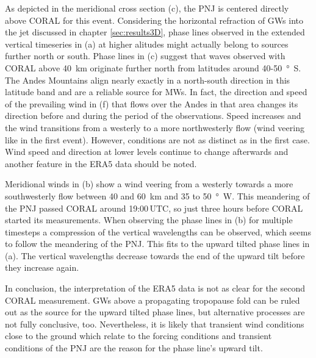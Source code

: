 As depicted in the meridional cross section (c), the PNJ is centered directly above CORAL for this event. Considering the horizontal refraction of GWs into the jet discussed in chapter \ref{sec:results3D}, phase lines observed in the extended vertical timeseries in (a) at higher alitudes might actually belong to sources further north or south. Phase lines in (c) suggest that waves observed with CORAL above \SI{40}{\kilo\meter} originate further north from latitudes around 40-\SI{50}{\degree S}. The Andes Mountains align nearly exactly in a north-south direction in this latitude band and are a reliable source for MWs. In fact, the direction and speed of the prevailing wind in (f) that flows over the Andes in that area changes its direction before and during the period of the observations. Speed increases and the wind transitions from a westerly to a more northwesterly flow (wind veering like in the first event). However, conditions are not as distinct as in the first case. Wind speed and direction at lower levels continue to change afterwards and another feature in the ERA5 data should be noted.

Meridional winds in (b) show a wind veering from a westerly towards a more southwesterly flow between 40 and \SI{60}{\kilo\meter} and 35 to \SI{50}{\degree W}. This meandering of the PNJ passed CORAL around 19:00$ \, \textrm{UTC}$, so just three hours before CORAL started its measurements. When observing the phase lines in (b) for multiple timesteps a compression of the vertical wavelengths can be observed, which seems to follow the meandering of the PNJ. This fits to the upward tilted phase lines in (a). The vertical wavelengths decrease towards the end of the upward tilt before they increase again.

In conclusion, the interpretation of the ERA5 data is not as clear for the second CORAL measurement. GWs above a propagating tropopause fold can be ruled out as the source for the upward tilted phase lines, but alternative processes are not fully conclusive, too. Nevertheless, it is likely that transient wind conditions close to the ground which relate to the forcing conditions and transient conditions of the PNJ are the reason for the phase line's upward tilt.

